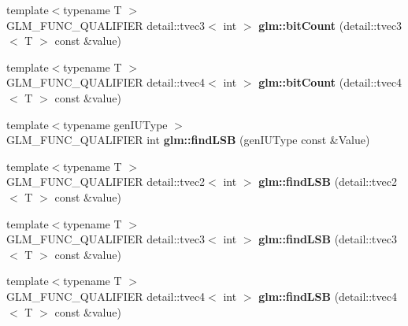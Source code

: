 \begin{DoxyCompactItemize}
\item 
\hypertarget{namespaceglm_af60807263ebcc1859cbb5ffc034182f6}{{\footnotesize template$<$typename T $>$ }\\\-G\-L\-M\-\_\-\-F\-U\-N\-C\-\_\-\-Q\-U\-A\-L\-I\-F\-I\-E\-R \*
detail\-::tvec3$<$ int $>$ {\bfseries glm\-::bit\-Count} (detail\-::tvec3$<$ \-T $>$ const \&value)}\label{namespaceglm_af60807263ebcc1859cbb5ffc034182f6}

\item 
\hypertarget{namespaceglm_a4559432c7a70a196a51a33891d6b6554}{{\footnotesize template$<$typename T $>$ }\\\-G\-L\-M\-\_\-\-F\-U\-N\-C\-\_\-\-Q\-U\-A\-L\-I\-F\-I\-E\-R \*
detail\-::tvec4$<$ int $>$ {\bfseries glm\-::bit\-Count} (detail\-::tvec4$<$ \-T $>$ const \&value)}\label{namespaceglm_a4559432c7a70a196a51a33891d6b6554}

\item 
\hypertarget{namespaceglm_a984d0192bd95085d8efb0a1a00a4e6d9}{{\footnotesize template$<$typename gen\-I\-U\-Type $>$ }\\\-G\-L\-M\-\_\-\-F\-U\-N\-C\-\_\-\-Q\-U\-A\-L\-I\-F\-I\-E\-R int {\bfseries glm\-::find\-L\-S\-B} (gen\-I\-U\-Type const \&\-Value)}\label{namespaceglm_a984d0192bd95085d8efb0a1a00a4e6d9}

\item 
\hypertarget{namespaceglm_ada2390329b6d8939a33c4c0483c1b51c}{{\footnotesize template$<$typename T $>$ }\\\-G\-L\-M\-\_\-\-F\-U\-N\-C\-\_\-\-Q\-U\-A\-L\-I\-F\-I\-E\-R \*
detail\-::tvec2$<$ int $>$ {\bfseries glm\-::find\-L\-S\-B} (detail\-::tvec2$<$ \-T $>$ const \&value)}\label{namespaceglm_ada2390329b6d8939a33c4c0483c1b51c}

\item 
\hypertarget{namespaceglm_a9706c7ccb2061db6a078a742fb9ed7d0}{{\footnotesize template$<$typename T $>$ }\\\-G\-L\-M\-\_\-\-F\-U\-N\-C\-\_\-\-Q\-U\-A\-L\-I\-F\-I\-E\-R \*
detail\-::tvec3$<$ int $>$ {\bfseries glm\-::find\-L\-S\-B} (detail\-::tvec3$<$ \-T $>$ const \&value)}\label{namespaceglm_a9706c7ccb2061db6a078a742fb9ed7d0}

\item 
\hypertarget{namespaceglm_affbe54a797335fd2dd46f5dbabb03f1e}{{\footnotesize template$<$typename T $>$ }\\\-G\-L\-M\-\_\-\-F\-U\-N\-C\-\_\-\-Q\-U\-A\-L\-I\-F\-I\-E\-R \*
detail\-::tvec4$<$ int $>$ {\bfseries glm\-::find\-L\-S\-B} (detail\-::tvec4$<$ \-T $>$ const \&value)}\label{namespaceglm_affbe54a797335fd2dd46f5dbabb03f1e}


\end{DoxyCompactItemize}
